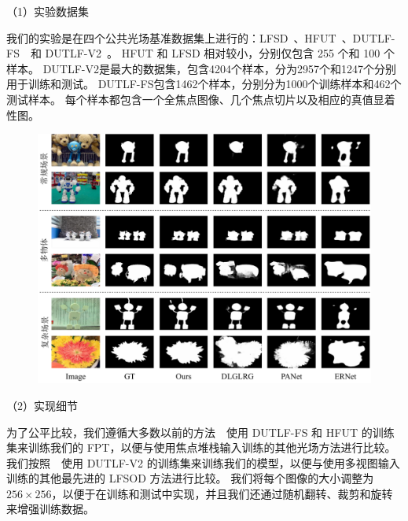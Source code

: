 %
%
%
%
%
（1）实验数据集
%
%
\par
%
%
我们的实验是在四个公共光场基准数据集上进行的：LFSD~\cite{li2014saliency}、HFUT~\cite{zhang2017saliency}、DUTLF-FS~\cite{zhang2019memory}~和 DUTLF-V2~\cite{piao2020dut}。 HFUT 和 LFSD 相对较小，分别仅包含 255 个和 100 个样本。 DUTLF-V2是最大的数据集，包含4204个样本，分为2957个和1247个分别用于训练和测试。 DUTLF-FS包含1462个样本，分别分为1000个训练样本和462个测试样本。 每个样本都包含一个全焦点图像、几个焦点切片以及相应的真值显着性图。
%
%
%
%
\par
%
%
%
\begin{figure}
	\centering
	\includegraphics[width=\linewidth]{figures/chapter3/compare_1}
	\label{figure:figure_comparison_1}
	\vspace{-0.2cm}
\end{figure}
%
%
%
（2）实现细节
%
%
\par
%
%
为了公平比较，我们遵循大多数以前的方法~\cite{piao2020exploit, liu2021light}~使用 DUTLF-FS 和 HFUT 的训练集来训练我们的 FPT，以便与使用焦点堆栈输入训练的其他光场方法进行比较。 我们按照~\cite{wang2022lfbcnet,jing2021occlusion}~使用 DUTLF-V2 的训练集来训练我们的模型，以便与使用多视图输入训练的其他最先进的 LFSOD 方法进行比较。 我们将每个图像的大小调整为 $256 \times 256$，以便于在训练和测试中实现，并且我们还通过随机翻转、裁剪和旋转来增强训练数据。
